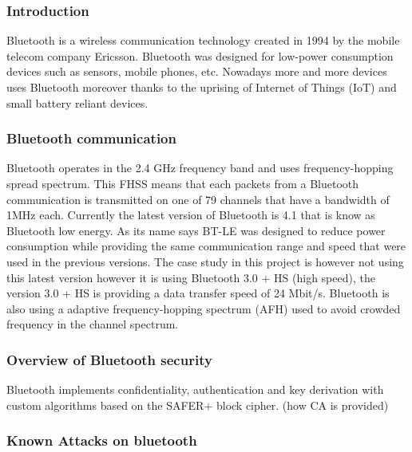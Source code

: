 \subsubsection{Introduction}
Bluetooth is a wireless communication technology created in 1994 by the mobile telecom company Ericsson. Bluetooth was designed for low-power consumption devices such as sensors, mobile phones, etc. Nowadays more and more devices uses Bluetooth moreover thanks to the uprising of Internet of Things (IoT) and small battery reliant devices.

\subsubsection{Bluetooth communication}
Bluetooth operates in the 2.4 GHz frequency band and uses frequency-hopping spread spectrum. This FHSS means that each packets from a Bluetooth communication is transmitted on one of 79 channels that have a bandwidth of 1MHz each. 
Currently the latest version of Bluetooth is 4.1 that is know as Bluetooth low energy. As its name says BT-LE was designed to reduce power consumption while providing the same communication range and speed that were used in the previous versions. The case study in this project is however not using this latest version however it is using Bluetooth 3.0 + HS (high speed), the version 3.0 + HS is providing a data transfer speed of 24 Mbit/s. Bluetooth is also using a adaptive frequency-hopping spectrum (AFH) used to avoid crowded frequency in the channel spectrum.

\subsubsection{Overview of Bluetooth security}
Bluetooth implements confidentiality, authentication and key derivation with custom algorithms based on the SAFER+ block cipher. (how CA is provided)

\subsubsection{Known Attacks on bluetooth}
